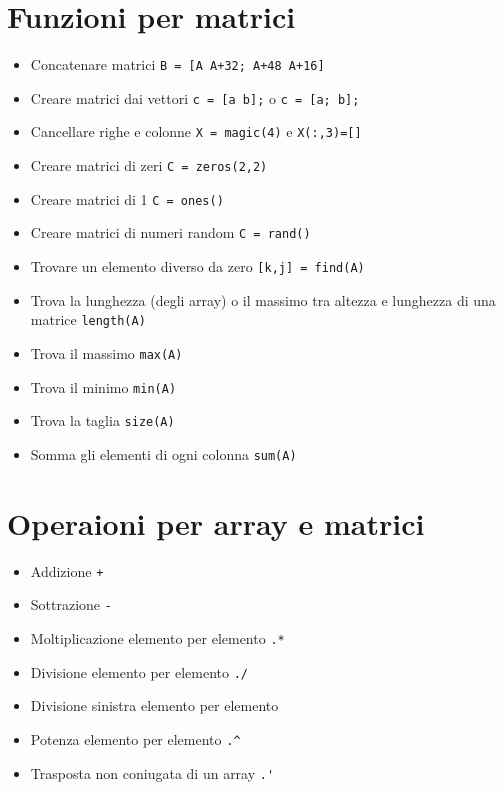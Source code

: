 \documentclass{article}
\begin{document}
\section{Funzioni per matrici}
\begin{itemize}
    \item Concatenare matrici
    \subitem \texttt{B = [A A+32; A+48 A+16]}
    \item Creare matrici dai vettori
    \subitem \texttt{c = [a b];} o \texttt{c = [a; b];}
    \item Cancellare righe e colonne
    \subitem \texttt{X = magic(4)} e \texttt{X(:,3)=[]}
    \item Creare matrici di zeri
    \subitem \texttt{C = zeros(2,2)}
    \item Creare matrici di 1
    \subitem \texttt{C = ones()}
    \item Creare matrici di numeri random
    \subitem \texttt{C = rand()}
    \item Trovare un elemento diverso da zero
    \subitem \texttt{[k,j] = find(A)}
    \item Trova la lunghezza (degli array) o il massimo tra altezza e lunghezza di una matrice
    \subitem \texttt{length(A)}
    \item Trova il massimo
    \subitem \texttt{max(A)}
    \item Trova il minimo
    \subitem \texttt{min(A)}
    \item Trova la taglia
    \subitem \texttt{size(A)}
    \item Somma gli elementi di ogni colonna
    \subitem \texttt{sum(A)}
\end{itemize}

\section{Operaioni per array e matrici}
\begin{itemize}
    \item Addizione
    \subitem \texttt{+}
    \item Sottrazione
    \subitem \texttt{-}
    \item Moltiplicazione elemento per elemento
    \subitem \texttt{.*}
    \item Divisione elemento per elemento
    \subitem \texttt{./}
    \item Divisione sinistra elemento per elemento
    \item Potenza elemento per elemento
    \subitem \texttt{.\^}
    \item Trasposta non coniugata di un array
    \subitem \texttt{.\'}
\end{itemize}
\end{document}
